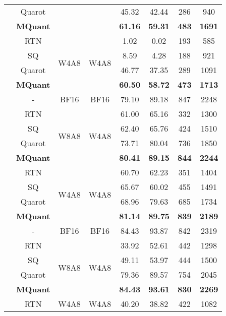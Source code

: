 \begin{table}[t]
{\begin{tabular}{c|c|cc|cccc}
  & Quarot & &  & 45.32 &42.44 &286 &940 \\
  \rowcolor{gray!25}
  \cellcolor{white}{{{Qwen-VL}}} & \textbf{MQuant} &  & & \textbf{61.16} &\textbf{59.31} &\textbf{483} & \textbf{1691} \\ \cline{2-8}
  \cellcolor{white}{{{-Chat-9.6B}}}& RTN & \multirow{4}{*}{W4A8} &\multirow{4}{*}{W4A8} & 1.02 &0.02 &193 &585 \\
  & SQ &  & &  8.59 &4.28 &188 &921 \\
  & Quarot &  & &  46.77 &37.35 & 289 & 1091 \\
  \rowcolor{gray!25}
  \cellcolor{white} &\textbf{MQuant} &  & & \textbf{60.50} &\textbf{58.72} &\textbf{473} &\textbf{1713} \\
\midrule
\rowcolor{gray!12}
\cellcolor{white}& - & BF16 & BF16 & 79.10 &89.18 &847 &2248 \\
& RTN &\multirow{4}{*}{W8A8} &\multirow{4}{*}{W4A8}& 61.00 & 65.16 & 332 & 1300 \\
  & SQ &  & &  62.40 & 65.76 & 424 & 1510 \\
  & Quarot  &  & & 73.71 &80.04 &736 &1850 \\
  \rowcolor{gray!25}
  \cellcolor{white}{MiniCPM-V} & \textbf{MQuant} &  & & \textbf{80.41} &\textbf{89.15} &\textbf{844} &\textbf{2244} \\ \cline{2-8}
  \cellcolor{white}{2.6-8B}& RTN & \multirow{4}{*}{W4A8} &\multirow{4}{*}{W4A8} &60.70 &62.23 &351 &1404 \\
  & SQ &  & &  65.67 &60.02 &455 &1491\\
  & Quarot &  & & 68.96 &79.63 &685 &1734 \\
  \rowcolor{gray!25}
  \cellcolor{white} & \textbf{MQuant} &  & & \textbf{81.14} & \textbf{89.75} &\textbf{839} &\textbf{2189} \\
\midrule
\rowcolor{gray!12}
\cellcolor{white}& - & BF16 & BF16 & 84.43 & 93.87 &842 &2319 \\
& RTN &\multirow{4}{*}{W8A8} &\multirow{4}{*}{W4A8}& 33.92&52.61&442&1298 \\
  & SQ &  & &  49.11 &53.97 &444 &1500 \\
  & Quarot  &  & & 79.36 &89.57 &754 &2045 \\
  \rowcolor{gray!25}
  \cellcolor{white}{Qwen2-VL} & \textbf{MQuant} &  & & \textbf{84.43} &\textbf{93.61} &\textbf{830} &\textbf{2269} \\ \cline{2-8}
  \cellcolor{white}{-7B}& RTN & \multirow{4}{*}{W4A8} &\multirow{4}{*}{W4A8} &40.20 &38.82 &422 &1082 \\

\end{tabular}}
\end{table}
